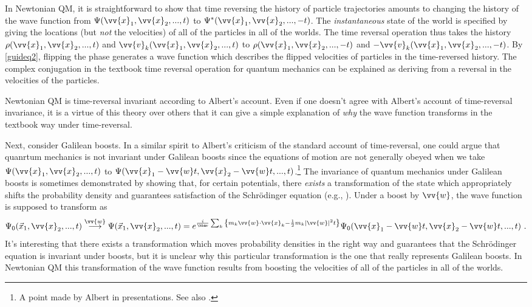 \documentclass[12pt,secnumarabic,balancelastpage,amsmath,amssymb,nofootinbib]{article}
\begin{document}
In Newtonian QM, it is straightforward to show that time reversing the history of particle trajectories amounts to changing the history of the wave function from $\Psi(\vv{x}_1,\vv{x}_2,...,t)$ to $\Psi^*(\vv{x}_1,\vv{x}_2,...,-t)$.  The \emph{instantaneous} state of the world is specified by giving the locations (but \emph{not} the velocities) of all of the particles in all of the worlds.  The time reversal operation thus takes the history $\rho(\vv{x}_1,\vv{x}_2,...,t)$ and $\vv{v}_k(\vv{x}_1,\vv{x}_2,...,t)$ to $\rho(\vv{x}_1,\vv{x}_2,...,-t)$ and $-\vv{v}_k(\vv{x}_1,\vv{x}_2,...,-t)$.  By \eqref{guideq2}, flipping the phase generates a wave function which describes the flipped velocities of particles in the time-reversed history.  The complex conjugation in the textbook time reversal operation for quantum mechanics can be explained as deriving from a reversal in the velocities of the particles.

Newtonian QM is time-reversal invariant according to Albert's account.  Even if one doesn't agree with Albert's account of time-reversal invariance, it is a virtue of this theory over others that it can give a simple explanation of \emph{why} the wave function transforms in the textbook way under time-reversal.

Next, consider Galilean boosts.  In a similar spirit to Albert's criticism of the standard account of time-reversal, one could argue that quanrtum mechanics is not invariant under Galilean boosts since the equations of motion are not generally obeyed when we take $\Psi(\vv{x}_1,\vv{x}_2,...,t)$ to $\Psi(\vv{x}_1-\vv{w}t,\vv{x}_2-\vv{w}t,...,t)$.\footnote{A point made by Albert in presentations.  See also \citet{valentini1997}.}  The invariance of quantum mechanics under Galilean boosts is sometimes demonstrated by showing that, for certain potentials, there \emph{exists} a transformation of the state which appropriately shifts the probability density and guarantees satisfaction of the Schr\"{o}dinger equation (e.g., \citealp[]{ballentine}).  Under a boost by $\vv{w}$, the wave function is supposed to transform as
\begin{equation}
\Psi_0(\vec{x}_1,\vv{x}_2,...,t)\stackrel{\vv{w}}{\longrightarrow}\Psi(\vec{x}_1,\vv{x}_2,...,t)= e^{\frac{i}{\hbar}\sum_k{\left\{m_k \vv{w}\cdot\vv{x}_k-\frac{1}{2}m_k |\vv{w}|^2 t\right\}}}\Psi_0(\vv{x}_1-\vv{w}t,\vv{x}_2-\vv{w}t,...,t)\ .
\label{transf}
\end{equation}
It's interesting that there exists a transformation which moves probability densities in the right way and guarantees that the Schr\"{o}dinger equation is invariant under boosts, but it is unclear why this particular transformation is the one that really represents Galilean boosts.  In Newtonian QM this transformation of the wave function results from boosting the velocities of all of the particles in all of the worlds.
\end{document}
